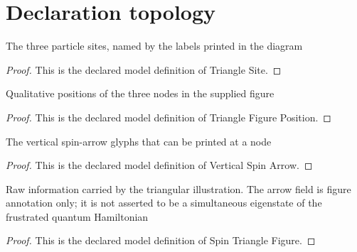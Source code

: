 \section{Declaration topology}
\begin{definition}
  \label{def:physics:phyx-mini-0606:phyxminiproblems-problemphyxmini0606-trianglesite}
  The three particle sites, named by the labels printed in the diagram
\end{definition}
\begin{proof}
  This is the declared model definition of Triangle Site.
\end{proof}
\begin{definition}
  \label{def:physics:phyx-mini-0606:phyxminiproblems-problemphyxmini0606-trianglefigureposition}
  Qualitative positions of the three nodes in the supplied figure
\end{definition}
\begin{proof}
  This is the declared model definition of Triangle Figure Position.
\end{proof}
\begin{definition}
  \label{def:physics:phyx-mini-0606:phyxminiproblems-problemphyxmini0606-verticalspinarrow}
  The vertical spin-arrow glyphs that can be printed at a node
\end{definition}
\begin{proof}
  This is the declared model definition of Vertical Spin Arrow.
\end{proof}
\begin{definition}
  \label{def:physics:phyx-mini-0606:phyxminiproblems-problemphyxmini0606-spintrianglefigure}
  Raw information carried by the triangular illustration. The arrow field is figure annotation only; it is not asserted to be a simultaneous eigenstate of the frustrated quantum Hamiltonian
\end{definition}
\begin{proof}
  This is the declared model definition of Spin Triangle Figure.
\end{proof}
